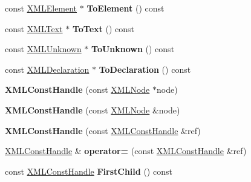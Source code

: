 \begin{DoxyCompactItemize}
const \hyperlink{classtinyxml2_1_1XMLElement}{X\+M\+L\+Element} $\ast$ {\bfseries To\+Element} () const
\item 
\mbox{\label{classtinyxml2_1_1XMLConstHandle_a80e24d90d476005aa35602a665358e2d}} 
const \hyperlink{classtinyxml2_1_1XMLText}{X\+M\+L\+Text} $\ast$ {\bfseries To\+Text} () const
\item 
\mbox{\label{classtinyxml2_1_1XMLConstHandle_a4395e5feaba7b456a81ca274880ea3d3}} 
const \hyperlink{classtinyxml2_1_1XMLUnknown}{X\+M\+L\+Unknown} $\ast$ {\bfseries To\+Unknown} () const
\item 
\mbox{\label{classtinyxml2_1_1XMLConstHandle_a55e306d105fa80d626041e4d3b77b716}} 
const \hyperlink{classtinyxml2_1_1XMLDeclaration}{X\+M\+L\+Declaration} $\ast$ {\bfseries To\+Declaration} () const
\item 
\mbox{\label{classtinyxml2_1_1XMLConstHandle_a098bda71fa11d7c74ccddab59d5dd534}} 
{\bfseries X\+M\+L\+Const\+Handle} (const \hyperlink{classtinyxml2_1_1XMLNode}{X\+M\+L\+Node} $\ast$node)
\item 
\mbox{\label{classtinyxml2_1_1XMLConstHandle_a8420a0c4720637e0529e78c2e22f2b0b}} 
{\bfseries X\+M\+L\+Const\+Handle} (const \hyperlink{classtinyxml2_1_1XMLNode}{X\+M\+L\+Node} \&node)
\item 
\mbox{\label{classtinyxml2_1_1XMLConstHandle_a639317ad315ff24f4ef0dc69312d7303}} 
{\bfseries X\+M\+L\+Const\+Handle} (const \hyperlink{classtinyxml2_1_1XMLConstHandle}{X\+M\+L\+Const\+Handle} \&ref)
\item 
\mbox{\label{classtinyxml2_1_1XMLConstHandle_a2d74c91df1ff9aa5f9b57e3dceddbf94}} 
\hyperlink{classtinyxml2_1_1XMLConstHandle}{X\+M\+L\+Const\+Handle} \& {\bfseries operator=} (const \hyperlink{classtinyxml2_1_1XMLConstHandle}{X\+M\+L\+Const\+Handle} \&ref)
\item 
\mbox{\label{classtinyxml2_1_1XMLConstHandle_aef06bd16cb308652a32b864b0a743136}} 
const \hyperlink{classtinyxml2_1_1XMLConstHandle}{X\+M\+L\+Const\+Handle} {\bfseries First\+Child} () const

\end{DoxyCompactItemize}
